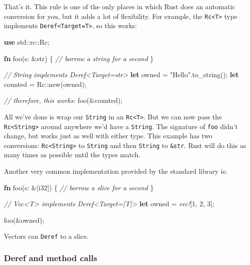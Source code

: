 \documentclass[a4paper,]{book}
\newenvironment{Shaded}{\begin{snugshade}}{\end{snugshade}}
\newcommand{\KeywordTok}[1]{\textcolor[rgb]{0.13,0.29,0.53}{\textbf{{#1}}}}
\newcommand{\DataTypeTok}[1]{\textcolor[rgb]{0.13,0.29,0.53}{{#1}}}
\newcommand{\DecValTok}[1]{\textcolor[rgb]{0.00,0.00,0.81}{{#1}}}
\newcommand{\StringTok}[1]{\textcolor[rgb]{0.31,0.60,0.02}{{#1}}}
\newcommand{\CommentTok}[1]{\textcolor[rgb]{0.56,0.35,0.01}{\textit{{#1}}}}
\newcommand{\PreprocessorTok}[1]{\textcolor[rgb]{0.56,0.35,0.01}{\textit{{#1}}}}
\newcommand{\NormalTok}[1]{{#1}}
\begin{document}
That's it. This rule is one of the only places in which Rust does an
automatic conversion for you, but it adds a lot of flexibility. For
example, the \texttt{Rc\textless{}T\textgreater{}} type implements
\texttt{Deref\textless{}Target=T\textgreater{}}, so this works:

\begin{Shaded}
\begin{Highlighting}[]
\KeywordTok{use} \NormalTok{std::rc::Rc;}

\KeywordTok{fn} \NormalTok{foo(s: &}\DataTypeTok{str}\NormalTok{) \{}
    \CommentTok{// borrow a string for a second}
\NormalTok{\}}

\CommentTok{// String implements Deref<Target=str>}
\KeywordTok{let} \NormalTok{owned = }\StringTok{"Hello"}\NormalTok{.to_string();}
\KeywordTok{let} \NormalTok{counted = Rc::new(owned);}

\CommentTok{// therefore, this works:}
\NormalTok{foo(&counted);}
\end{Highlighting}
\end{Shaded}

All we've done is wrap our \texttt{String} in an
\texttt{Rc\textless{}T\textgreater{}}. But we can now pass the
\texttt{Rc\textless{}String\textgreater{}} around anywhere we'd have a
\texttt{String}. The signature of \texttt{foo} didn't change, but works
just as well with either type. This example has two conversions:
\texttt{Rc\textless{}String\textgreater{}} to \texttt{String} and then
\texttt{String} to \texttt{\&str}. Rust will do this as many times as
possible until the types match.

Another very common implementation provided by the standard library is:

\begin{Shaded}
\begin{Highlighting}[]
\KeywordTok{fn} \NormalTok{foo(s: &[}\DataTypeTok{i32}\NormalTok{]) \{}
    \CommentTok{// borrow a slice for a second}
\NormalTok{\}}

\CommentTok{// Vec<T> implements Deref<Target=[T]>}
\KeywordTok{let} \NormalTok{owned = }\PreprocessorTok{vec!}\NormalTok{[}\DecValTok{1}\NormalTok{, }\DecValTok{2}\NormalTok{, }\DecValTok{3}\NormalTok{];}

\NormalTok{foo(&owned);}
\end{Highlighting}
\end{Shaded}

Vectors can \texttt{Deref} to a slice.

\subsubsection{Deref and method calls}\label{deref-and-method-calls}
\end{document}
